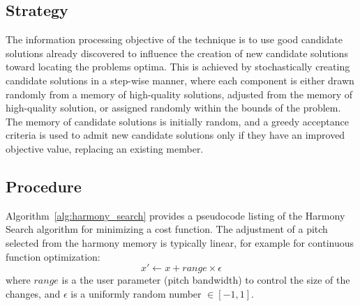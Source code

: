\subsection{Strategy}
The information processing objective of the technique is to use good candidate solutions already discovered to influence the creation of new candidate solutions toward locating the problems optima.
This is achieved by stochastically creating candidate solutions in a step-wise manner, where each component is either drawn randomly from a memory of high-quality solutions, adjusted from the memory of high-quality solution, or assigned randomly within the bounds of the problem. The memory of candidate solutions is initially random, and a greedy acceptance criteria is used to admit new candidate solutions only if they have an improved objective value, replacing an existing member.

\subsection{Procedure}
Algorithm~\ref{alg:harmony_search} provides a pseudocode listing of the Harmony Search algorithm for minimizing a cost function. 
The adjustment of a pitch selected from the harmony memory is typically linear, for example for continuous function optimization: 
\begin{equation}
	x\prime \leftarrow x + range \times \epsilon
\end{equation}
where $range$ is a the user parameter (pitch bandwidth) to control the size of the changes, and $\epsilon$ is a uniformly random number $\in [-1,1]$.

